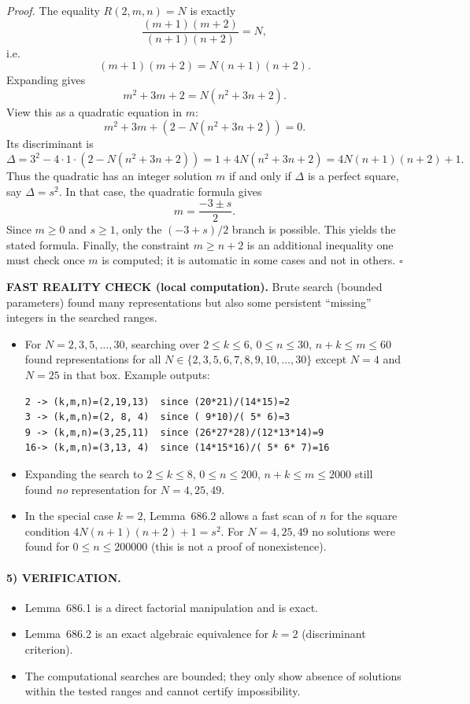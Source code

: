 \emph{Proof.}
The equality $R(2,m,n)=N$ is exactly
\[
\frac{(m+1)(m+2)}{(n+1)(n+2)}=N,
\]
i.e.
\[
(m+1)(m+2)=N(n+1)(n+2).
\]
Expanding gives
\[
m^2+3m+2 = N(n^2+3n+2).
\]
View this as a quadratic equation in $m$:
\[
m^2+3m+(2-N(n^2+3n+2))=0.
\]
Its discriminant is
\[
\Delta = 3^2-4\cdot 1\cdot (2-N(n^2+3n+2))
=1+4N(n^2+3n+2)=4N(n+1)(n+2)+1.
\]
Thus the quadratic has an integer solution $m$ if and only if $\Delta$ is a perfect square, say $\Delta=s^2$.
In that case, the quadratic formula gives
\[
m=\frac{-3\pm s}{2}.
\]
Since $m\ge 0$ and $s\ge 1$, only the $(-3+s)/2$ branch is possible. This yields the stated formula.
Finally, the constraint $m\ge n+2$ is an additional inequality one must check once $m$ is computed; it is automatic in some cases and not in others.
\hfill$\square$

\medskip
\noindent\textbf{FAST REALITY CHECK (local computation).}
Brute search (bounded parameters) found many representations but also some persistent ``missing'' integers in the searched ranges.

\begin{itemize}
\item For $N=2,3,5,\dots,30$, searching over $2\le k\le 6$, $0\le n\le 30$, $n+k\le m\le 60$ found representations for all
$N\in\{2,3,5,6,7,8,9,10,\dots,30\}$ except $N=4$ and $N=25$ in that box. Example outputs:
\begin{verbatim}
2 -> (k,m,n)=(2,19,13)  since (20*21)/(14*15)=2
3 -> (k,m,n)=(2, 8, 4)  since ( 9*10)/( 5* 6)=3
9 -> (k,m,n)=(3,25,11)  since (26*27*28)/(12*13*14)=9
16-> (k,m,n)=(3,13, 4)  since (14*15*16)/( 5* 6* 7)=16
\end{verbatim}
\item Expanding the search to $2\le k\le 8$, $0\le n\le 200$, $n+k\le m\le 2000$ still found \emph{no} representation for $N=4,25,49$.
\item In the special case $k=2$, Lemma~686.2 allows a fast scan of $n$ for the square condition $4N(n+1)(n+2)+1=s^2$.
For $N=4,25,49$ no solutions were found for $0\le n\le 200000$ (this is not a proof of nonexistence).
\end{itemize}

\paragraph{5) VERIFICATION.}
\begin{itemize}
\item Lemma~686.1 is a direct factorial manipulation and is exact.
\item Lemma~686.2 is an exact algebraic equivalence for $k=2$ (discriminant criterion).
\item The computational searches are bounded; they only show absence of solutions within the tested ranges and cannot certify impossibility.
\end{itemize}

